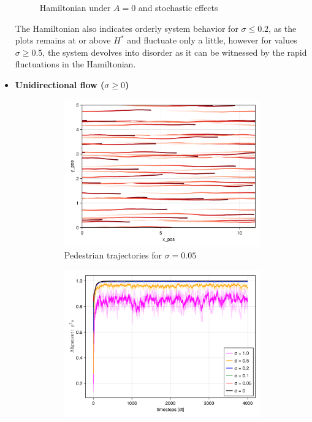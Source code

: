 \begin{itemize}
\begin{figure}[H]
\begin{subfigure}{.49\textwidth}
        \end{subfigure}
        \caption{Hamiltonian under $A=0$ and stochastic effects}
        \label{plot:stoc_nointeraction_hamiltonian}
    \end{figure}
The Hamiltonian also indicates orderly system behavior for $\sigma \leq 0.2$, as the plots remains at or above $H^*$ and fluctuate only a little, however for values $\sigma \geq 0.5$, the system devolves into disorder as it can be witnessed by the rapid fluctuations in the Hamiltonian.
    \item \textbf{Unidirectional flow ($\sigma \geq 0$)}
    \begin{figure}[H]
        \centering
        \begin{subfigure}{.49\textwidth}
            \centering
            \includegraphics[width=\linewidth]{figures/ch5_collective_stoch/traj_stochastic_uni_10000.png}
            \caption{Pedestrian trajectories for $\sigma = 0.05$}
            \label{plot:stoc_uni_traj}
        \end{subfigure}
        \begin{subfigure}{.49\textwidth}
            \centering
            \includegraphics[width=\linewidth]{figures/ch5_collective_stoch/align_stochastic_uni.png}

\end{subfigure}
\end{figure}
\end{itemize}
